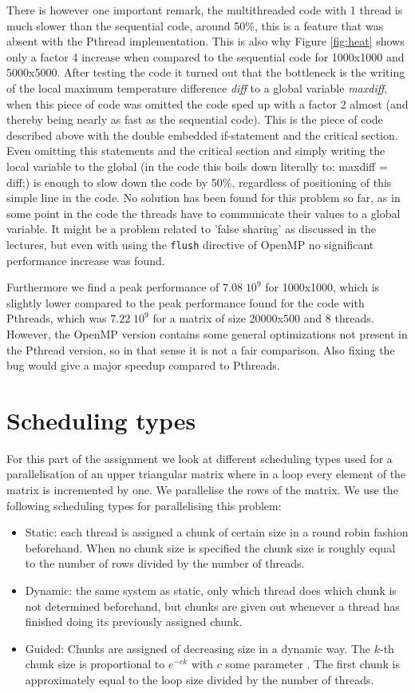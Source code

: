 \documentclass[11pt,a4paper,onecolumn]{article}
\begin{document}
There is however one important remark, the multithreaded code with 1 thread is much slower than the sequential code, around 50\%, this is a feature that was absent with the Pthread implementation. This is also why Figure \ref{fig:heat} shows only a factor 4 increase when compared to the sequential code for 1000x1000 and 5000x5000. After testing the code it turned out that the bottleneck is the writing of the local maximum temperature difference \emph{diff} to a global variable \emph{maxdiff}, when this piece of code was omitted the code sped up with a factor 2 almost (and thereby being nearly as fast as the sequential code). This is the piece of code described above with the double embedded if-statement and the critical section. Even omitting this statements and the critical section and simply writing the local variable to the global (in the code this boils down literally to: maxdiff = diff;) is enough to slow down the code by 50\%, regardless of positioning of this simple line in the code. No solution has been found for this problem so far, as in some point in the code the threads have to communicate their values to a global variable. It might be a problem related to 'false sharing' as discussed in the lectures, but even with using the \texttt{flush} directive of OpenMP no significant performance increase was found.

Furthermore we find a peak performance of $7.08 \; 10^9$ for 1000x1000, which is slightly lower compared to the peak performance found for the code with Pthreads, which was $7.22 \; 10^9$ for a matrix of size 20000x500 and 8 threads. However, the OpenMP version contains some general optimizations not present in the Pthread version, so in that sense it is not a fair comparison. Also fixing the bug would give a major speedup compared to Pthreads.

\section{Scheduling types}
For this part of the assignment we look at different scheduling types used for a parallelisation of an upper triangular matrix where in a loop every element of the matrix is incremented by one. We parallelise the rows of the matrix. We use the following scheduling types for parallelising this problem:
\begin{itemize}
\item 
  Static: each thread is assigned a chunk of certain size in a round robin fashion beforehand. When no chunk size is specified the chunk size is roughly equal to the number of rows divided by the number of threads.
\item
  Dynamic: the same system as static, only which thread does which chunk is not determined beforehand, but chunks are given out whenever a thread has finished doing its previously assigned chunk.
\item
  Guided: Chunks are assigned of decreasing size in a dynamic way. The $k$-th chunk size is proportional to $e^{-ck}$ with $c$ some parameter \cite{chunk}. The first chunk is approximately equal to the loop size divided by the number of threads.
\end{itemize}
\end{document}
